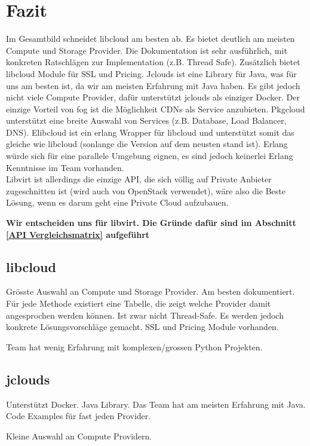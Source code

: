 \newpage

\section{Fazit}

Im Gesamtbild schneidet libcloud am besten ab. Es bietet deutlich am meisten Compute und 
Storage Provider. Die Dokumentation ist sehr ausführlich, mit konkreten Ratschlägen zur 
Implementation (z.B. Thread Safe). Zusätzlich bietet libcloud Module für SSL und Pricing.
Jclouds ist eine Library für Java, was für uns am besten ist, da wir am meisten Erfahrung mit 
Java haben. Es gibt jedoch nicht viele Compute Provider, dafür unterstützt jclouds als einziger Docker.
Der einzige Vorteil von fog ist die Möglichkeit CDNs als Service anzubieten.
Pkgcloud unterstützt eine breite Auswahl von Services (z.B. Database, Load Balancer, DNS).
Elibcloud ist ein erlang Wrapper für libcloud und unterstützt somit das gleiche wie libcloud 
(sonlange die Version auf dem neusten stand ist). Erlang würde sich für eine parallele Umgebung eignen, 
es sind jedoch keinerlei Erlang Kenntnisse im Team vorhanden.\\
Libvirt ist allerdings die einzige API, die sich völlig auf Private Anbieter 
zugeschnitten ist (wird auch von OpenStack verwendet), wäre also die Beste 
Lösung, wenn es darum geht eine Private Cloud aufzubauen.

\textbf{Wir entscheiden uns für libvirt. Die Gründe dafür sind im Abschnitt \ref{API Vergleichsmatrix} aufgeführt}


\subsection{libcloud}
\begin{Argumentation}
\pro Grösste Auswahl an Compute und Storage Provider.
\pro Am besten dokumentiert. Für jede Methode existiert eine Tabelle, die zeigt welche Provider damit angesprochen werden können.
\pro Ist zwar nicht Thread-Safe. Es werden jedoch konkrete Lösungsvorschläge gemacht.
\pro SSL und Pricing Module vorhanden.

\contra Team hat wenig Erfahrung mit komplexen/grossen Python Projekten.
\end{Argumentation}

\subsection{jclouds}
\begin{Argumentation}
\pro Unterstützt Docker.
\pro Java Library. Das Team hat am meisten Erfahrung mit Java.
\pro Code Examples für fast jeden Provider.

\contra Kleine Auswahl an Compute Providern.
\end{Argumentation}


